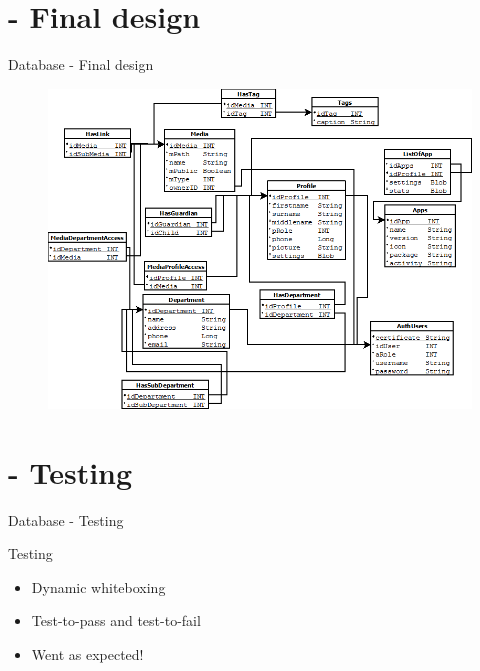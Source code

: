 \section{ - Final design}
\begin{frame}{Database - Final design}
\begin{figure}[htbp]
	\centering
		\includegraphics[width=1.00\textwidth]{Img/DiaDesign.png}
	\label{fig:DiaDesign}
\end{figure}


\end{frame}

\section{ - Testing}
\begin{frame}{Database - Testing}

    \begin{block}{Testing}
        \begin{itemize}
        \item Dynamic whiteboxing
        \item \pause Test-to-pass and test-to-fail
        \item \pause Went as expected!
				\end{itemize}
    \end{block}

\end{frame}